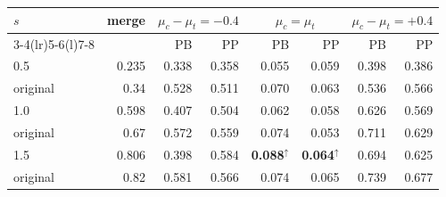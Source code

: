 \begin{tabular}{@{}lrrrrrrr@{}}
\toprule
$s$ & merge & \multicolumn{2}{c}{$\mu_c-\mu_t=-0.4$} & \multicolumn{2}{c}{$\mu_c=\mu_t$} & \multicolumn{2}{c}{$\mu_c-\mu_t=+0.4$}\\
\cmidrule(lr){3-4}\cmidrule(lr){5-6}\cmidrule(l){7-8}
 & & PB & PP & PB & PP & PB & PP\\
\midrule
0.5 & 0.235 & 0.338 & 0.358 & 0.055 & 0.059 & 0.398 & 0.386\\
\quad original & 0.34 & 0.528 & 0.511 & 0.070 & 0.063 & 0.536 & 0.566\\
1.0 & 0.598 & 0.407 & 0.504 & 0.062 & 0.058 & 0.626 & 0.569\\
\quad original & 0.67 & 0.572 & 0.559 & 0.074 & 0.053 & 0.711 & 0.629\\
1.5 & 0.806 & 0.398 & 0.584 & \textbf{0.088}$^{\uparrow}$ & \textbf{0.064}$^{\uparrow}$ & 0.694 & 0.625\\
\quad original & 0.82 & 0.581 & 0.566 & 0.074 & 0.065 & 0.739 & 0.677\\
\bottomrule
\end{tabular}
